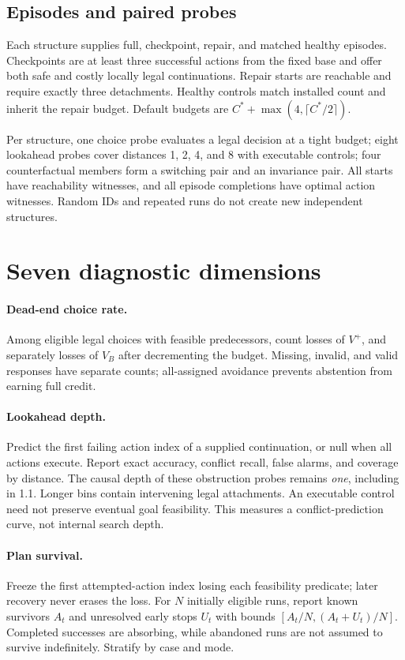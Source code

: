 \documentclass[10pt,twocolumn]{article}
\begin{document}
\subsection{Episodes and paired probes}
Each structure supplies full, checkpoint, repair, and matched healthy episodes.
Checkpoints are at least three successful actions from the fixed base and offer
both safe and costly locally legal continuations. Repair starts are reachable and require exactly
three detachments. Healthy controls match installed count and inherit the
repair budget. Default budgets are $C^*+\max(4,\lceil C^*/2\rceil)$.

Per structure, one choice probe evaluates a legal decision at a tight budget;
eight lookahead probes cover distances 1, 2, 4, and 8 with executable controls;
four counterfactual members form a switching pair and an invariance pair.
All starts have reachability witnesses, and all episode completions have
optimal action witnesses. Random IDs and repeated runs do not create new
independent structures.

\section{Seven diagnostic dimensions}
\paragraph{Dead-end choice rate.}
Among eligible legal choices with feasible predecessors, count losses of
$V^+$, and separately losses of $V_B$ after decrementing the budget. Missing,
invalid, and valid responses have separate counts; all-assigned avoidance
prevents abstention from earning full credit.

\paragraph{Lookahead depth.}
Predict the first failing action index of a supplied continuation, or null
when all actions execute. Report exact accuracy, conflict recall, false alarms,
and coverage by distance. The causal depth of these obstruction probes remains
\emph{one}, including in 1.1. Longer bins contain intervening legal attachments.
An executable control need not preserve eventual goal feasibility.
This measures a conflict-prediction curve, not internal search depth.

\paragraph{Plan survival.}
Freeze the first attempted-action index losing each feasibility predicate;
later recovery never erases the loss. For $N$ initially eligible runs, report
known survivors $A_t$ and unresolved early stops $U_t$ with bounds
$[A_t/N,(A_t+U_t)/N]$. Completed successes are absorbing, while abandoned
runs are not assumed to survive indefinitely. Stratify by case and mode.
\end{document}
